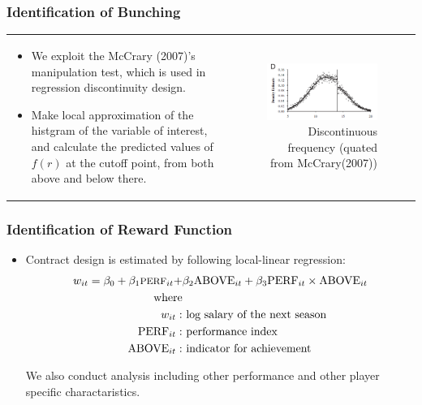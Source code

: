 \documentclass[dvipdfmx,12pt]{beamer}
\begin{document}
\begin{frame}\frametitle{Identification of Bunching}
  \begin{tabular}{lr}
    \begin{minipage}[H]{0.45\textwidth}
      \small
      \begin{itemize}
        \item We exploit the McCrary (2007)'s manipulation test, which is used in regression discontinuity design.

        \item Make local approximation of the histgram of the variable of interest, and calculate the predicted values of $f(r)$ at the cutoff point, from both above and below there.
      \end{itemize}
    \end{minipage}
    &
    \begin{minipage}[H]{0.5\textwidth}
      \begin{figure}
        \includegraphics[keepaspectratio, scale = 0.8]{graphs/McCrary_figD.png}
        \caption{Discontinuous frequency (quated from McCrary(2007))}
        \label{McC}
      \end{figure}
    \end{minipage}
  \end{tabular}
\end{frame}

\begin{frame}\frametitle{Identification of Reward Function}
  \begin{itemize}
    \small
    \item Contract design is estimated by following local-linear regression:
    \begin{align*}
      \footnotesize
      w_{it} = \beta_0 + \beta_1 \text{PERF}_{it} + &\beta_2 \text{ABOVE}_{it} + \beta_3 \text{PERF}_{it} \times \text{ABOVE}_{it} \\
      \text{where} \\
      w_{it}: & \text{ log salary of the next season} \\
      \text{PERF}_{it}: & \text{ performance index} \\
      \text{ABOVE}_{it}: & \text{ indicator for achievement}
    \end{align*}

    We also conduct analysis including other performance and other player specific charactaristics.
  \end{itemize}
\end{frame}
\end{document}
